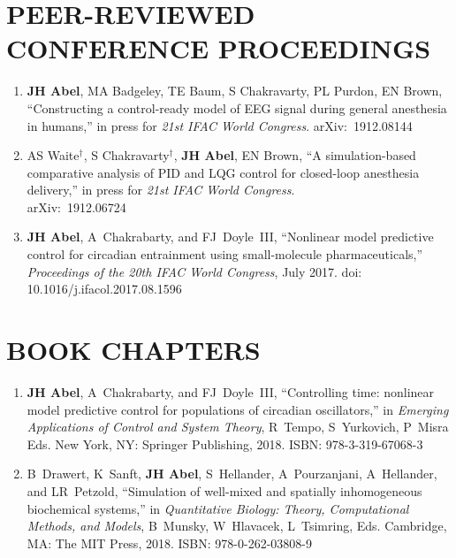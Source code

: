 \documentclass[line,10pt]{res}
\begin{document}
\begin{resume}
\section{\bf PEER-REVIEWED CONFERENCE PROCEEDINGS}
\vspace{1em}\null
\begin{enumerate}
    \setlength\itemsep{0.8em}
    \item \textbf{JH Abel}, MA Badgeley, TE Baum, S Chakravarty, PL Purdon, EN Brown, ``Constructing a control-ready model of EEG signal during general anesthesia in humans,'' in press for \textit{21st IFAC World Congress}. arXiv:~1912.08144
    \item AS Waite$^\dag$, S Chakravarty$^\dag$, \textbf{JH Abel}, EN Brown, ``A simulation-based comparative analysis of PID and LQG control for closed-loop anesthesia delivery,'' in press for \textit{21st IFAC World Congress}.\\arXiv:~1912.06724
    \item \textbf{JH Abel}, A~Chakrabarty, and FJ~Doyle~III, ``Nonlinear model predictive control for circadian entrainment using small-molecule pharmaceuticals,'' \textit{Proceedings of the 20th IFAC World Congress}, July 2017. doi: %
    10.1016/j.ifacol.2017.08.1596%
\end{enumerate}

\section{\bf BOOK CHAPTERS}
\vspace{1em}\null
\begin{enumerate}
    \setlength\itemsep{0.8em}
    \item \textbf{JH Abel}, A~Chakrabarty, and FJ~Doyle~III, ``Controlling time: nonlinear model predictive control for populations of circadian oscillators,'' in \textit{Emerging Applications of Control and System Theory}, R~Tempo, S~Yurkovich, P~Misra Eds. New York, NY: Springer Publishing, 2018. ISBN: 978-3-319-67068-3
    \item B~Drawert, K~Sanft, \textbf{JH Abel}, S~Hellander, A~Pourzanjani, A~Hellander, and LR~Petzold, ``Simulation of well-mixed and spatially inhomogeneous biochemical systems,'' in \textit{Quantitative Biology: Theory, Computational Methods, and Models},
B~Munsky, W~Hlavacek, L~Tsimring, Eds.
Cambridge, MA: The MIT Press, 2018. ISBN: 978-0-262-03808-9
\end{enumerate}


\end{resume}
\end{document}
